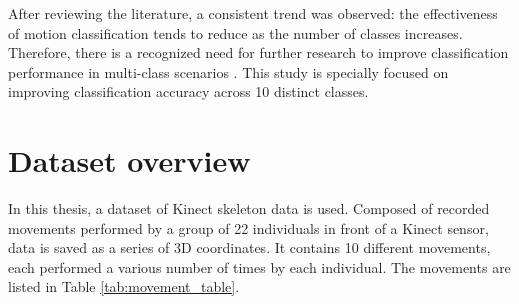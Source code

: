       \vspace{0.5cm}
      
      After reviewing the literature, a consistent trend was observed: the effectiveness of motion classification tends to reduce as the number of classes increases. Therefore, there is a recognized need for further research to improve classification performance in multi-class scenarios \cite{acis_classification_2023}. This study is specially focused on improving classification accuracy across 10 distinct classes.

   \section{Dataset overview}
      
      In this thesis, a dataset of Kinect skeleton data is used. Composed of recorded movements performed by a group of 22 individuals in front of a Kinect sensor, data is saved as a series of 3D coordinates. It contains 10 different movements, each performed a various number of times by each individual. The movements are listed in Table \ref{tab:movement_table}.

      \newpage

